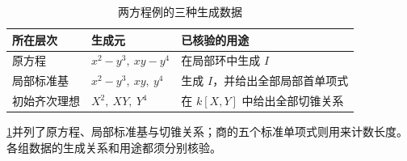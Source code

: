 \begin{table}[htbp]
	\centering
	\caption{两方程例的三种生成数据}
	\label{b3:tab:F-two-equations-generators}
	\begin{tabularx}{\textwidth}{@{}>{\raggedright\arraybackslash}p{}>{\raggedright\arraybackslash}p{}>{\raggedright\arraybackslash}X@{}}
		\toprule
		所在层次 & 生成元 & 已核验的用途 \\
		\midrule
		原方程 & \(x^2-y^3,\ xy-y^4\) & 在局部环中生成 \(I\) \\
		局部标准基 & \(x^2-y^3,\ xy,\ y^4\) & 生成 \(I\)，并给出全部局部首单项式 \\
		初始齐次理想 & \(X^2,\ XY,\ Y^4\) & 在 \(k[X,Y]\) 中给出全部切锥关系 \\
		\bottomrule
	\end{tabularx}
\end{table}

\cref{b3:tab:F-two-equations-generators}并列了原方程、局部标准基与切锥关系；商的五个标准单项式则用来计数长度。各组数据的生成关系和用途都须分别核验。
